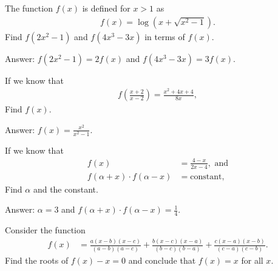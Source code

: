 \documentclass[12pt,a4paper]{memoir}
\theoremstyle{definition}
\begin{document}
\begin{tcolorbox}
	\begin{question}
		The function $f(x)$ is defined for $x>1$ as
		\begin{align*}
			f(x) = \log(x+\sqrt{x^2-1}).
		\end{align*}
		Find $f(2x^2-1)$ and $f(4x^3-3x)$ in terms of $f(x)$.
	\end{question}
\end{tcolorbox}

\begin{solution}[name=Solution by Parviz Shahriari]
	Answer: $f(2x^2-1)=2f(x)$ and $f(4x^3-3x)=3f(x)$.
\end{solution}


\begin{tcolorbox}
	\begin{question}
		If we know that
		\begin{align*}
			f\left(\frac{x+2}{x-2}\right) = \frac{x^2+4x+4}{8x},
		\end{align*}
		Find $f(x)$.
	\end{question}
\end{tcolorbox}

\begin{solution}[name=Solution by Parviz Shahriari]
	Answer: $f(x) = \frac{x^2}{x^2-1}$.
\end{solution}


\begin{tcolorbox}
	\begin{question}
		If we know that
		\begin{align*}
			f(x) &= \frac{4-x}{2x-4}, \text{ and}\\
			f(\alpha+x) \cdot f(\alpha-x) &= \text{constant},
		\end{align*}
		Find $\alpha$ and the constant.
	\end{question}
\end{tcolorbox}

\begin{solution}[name=Solution by Parviz Shahriari]
	Answer: $\alpha=3$ and $f(\alpha+x) \cdot f(\alpha-x) = \frac{1}{4}$.
\end{solution}



\begin{tcolorbox}
	\begin{question}
		Consider the function
		\begin{align*}
			f(x) &= \frac{a(x-b)(x-c)}{(a-b)(a-c)} + \frac{b(x-c)(x-a)}{(b-c)(b-a)} + \frac{c(x-a)(x-b)}{(c-a)(c-b)}.
		\end{align*}
		Find the roots of $f(x)-x=0$ and conclude that $f(x)=x$ for all $x$.
	\end{question}
\end{tcolorbox}
\end{document}
